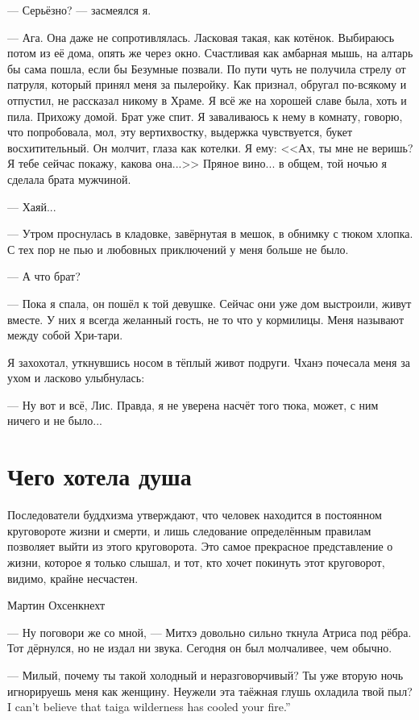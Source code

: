 --- Серьёзно? --- засмеялся я.

--- Ага.
Она даже не сопротивлялась.
Ласковая такая, как котёнок.
Выбираюсь потом из её дома, опять же через окно.
Счастливая как амбарная мышь, на алтарь бы сама пошла, если бы Безумные позвали.
По пути чуть не получила стрелу от патруля, который принял меня за пылеройку.
Как признал, обругал по-всякому и отпустил, не рассказал никому в Храме.
Я всё же на хорошей славе была, хоть и пила.
Прихожу домой.
Брат уже спит.
Я заваливаюсь к нему в комнату, говорю, что попробовала, мол, эту вертихвостку, выдержка чувствуется, букет восхитительный.
Он молчит, глаза как котелки.
Я ему: <<Ах, ты мне не веришь?
Я тебе сейчас покажу, какова она...>>
Пряное вино... в общем, той ночью я сделала брата мужчиной.

--- Хаяй...

--- Утром проснулась в кладовке, завёрнутая в мешок, в обнимку с тюком хлопка.
С тех пор не пью и любовных приключений у меня больше не было.

--- А что брат?

--- Пока я спала, он пошёл к той девушке.
Сейчас они уже дом выстроили, живут вместе.
У них я всегда желанный гость, не то что у кормилицы.
Меня называют между собой Хри-тари\FM.

Я захохотал, уткнувшись носом в тёплый живот подруги.
Чханэ почесала меня за ухом и ласково улыбнулась:

--- Ну вот и всё, Лис.
Правда, я не уверена насчёт того тюка, может, с ним ничего и не было...

\section{Чего хотела душа}

\epigraph
{Последователи буддхизма утверждают, что человек находится в постоянном круговороте жизни и смерти, и лишь следование определённым правилам позволяет выйти из этого круговорота.
Это самое прекрасное представление о жизни, которое я только слышал, и тот, кто хочет покинуть этот круговорот, видимо, крайне несчастен.}
{Мартин Охсенкнехт}

--- Ну поговори же со мной, --- Митхэ довольно сильно ткнула Атриса под рёбра.
Тот дёрнулся, но не издал ни звука.
Сегодня он был молчаливее, чем обычно.

--- Милый, почему ты такой холодный и неразговорчивый?
Ты уже вторую ночь игнорируешь меня как женщину.
{Неужели эта таёжная глушь охладила твой пыл?}
{I can't believe that taiga wilderness has cooled your fire.''}

